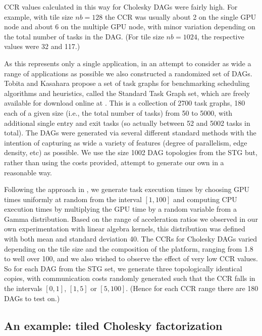 \documentclass[runningheads]{llncs}
\begin{document}
CCR values calculated in this way for Cholesky DAGs were fairly high. For example, with tile size $nb = 128$ the CCR was usually about 2 on the single GPU node and about 6 on the multiple GPU node, with minor variation depending on the total number of tasks in the DAG. (For tile size $nb = 1024$, the respective values were 32 and 117.)

As this represents only a single application, in an attempt to consider as wide a range of applications as possible we also constructed a randomized set of DAGs. Tobita and Kasahara \cite{Tobita2002} propose a set of task graphs for benchmarking scheduling algorithms and heuristics, called the Standard Task Graph set, which are freely available for download online at . This is a collection of 2700 task graphs, 180 each of a given size (i.e., the total number of tasks) from 50 to 5000, with additional single entry and exit tasks (so actually between 52 and 5002 tasks in total). The DAGs were generated via several different standard methods with the intention of capturing as wide a variety of features (degree of parallelism, edge density, etc) as possible. We use the size 1002 DAG topologies from the STG but, rather than using the costs provided, attempt to generate our own in a reasonable way. 

Following the approach in \cite{canon2018}, we generate task execution times by choosing GPU times uniformly at random from the interval $[1, 100]$ and computing CPU execution times by multiplying the GPU time by a random variable from a Gamma distribution. Based on the range of acceleration ratios we observed in our own experimentation with linear algebra kernels, this distribution was defined with both mean and standard deviation 40. The CCRs for Cholesky DAGs varied depending on the tile size and the composition of the platform, ranging from 1.8 to well over 100, and we also wished to observe the effect of very low CCR values. So for each DAG from the STG set, we generate three topologically identical copies, with communication costs randomly generated such that the CCR falls in the intervals $[0, 1]$, $[1, 5]$ or $[5, 100]$. (Hence for each CCR range there are 180 DAGs to test on.) 

\subsection{An example: tiled Cholesky factorization}
\label{subsect.cholesky}
\end{document}
